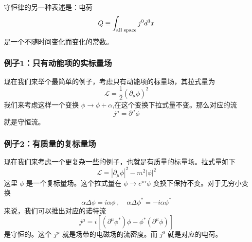 守恒律的另一种表述是：电荷
\begin{equation}
Q \equiv \int_{\rm all\,\, space} j^0 d^3 x
\end{equation}
是一个不随时间变化而变化的常数。
\subsubsection{例子1：只有动能项的实标量场}
现在我们来举个最简单的例子，考虑只有动能项的标量场，其拉式量为
\begin{equation}
\mathcal L = \frac{1}{2} (\partial_\mu \phi)^2
\end{equation}
我们来考虑这样一个变换 $\phi \rightarrow \phi + \alpha $,在这个变换下拉式量不变。那么对应的流
\begin{equation}
j^\mu = \partial^\mu \phi
\end{equation}
就是守恒流。
\subsubsection{例子2：有质量的复标量场}
现在我们来考虑一个更复杂一些的例子，也就是有质量的标量场。拉式量如下
\begin{equation}
\mathcal L = |\partial_\mu\phi|^2 - m^2 |\phi|^2
\end{equation}
这里 $\phi$ 是一个复标量场。这个拉式量在 $\phi\rightarrow e^{i\alpha}\phi$ 变换下保持不变。对于无穷小变换
\begin{equation}\label{classi_eq18}
\alpha \Delta \phi = i \alpha \phi~,\quad \alpha \Delta \phi^* = -i\alpha \phi^*
\end{equation}
来说，我们可以推出对应的诺特流
\begin{equation}
j^\mu = i[(\partial^\mu \phi^*)\phi-\phi^*(\partial^\mu \phi)]
\end{equation}
是守恒的。这个 $j^\mu$ 就是场带的电磁场的流密度。而 $j^0$ 就是对应的电荷。

